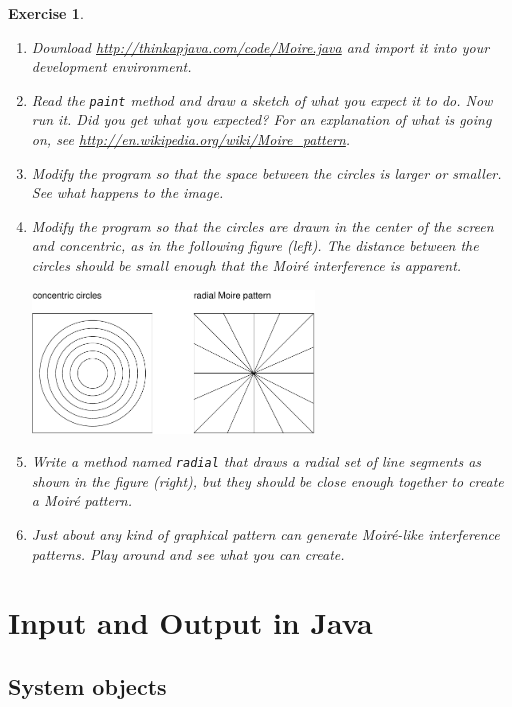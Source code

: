 \documentclass[12pt]{book}
\theoremstyle{exercise}
\newtheorem{exercise}{Exercise}[chapter]
\begin{document}
\begin{exercise}
\begin{enumerate}

\item Download
\url{http://thinkapjava.com/code/Moire.java} and import it into
your development environment.

\item Read the {\tt paint} method and draw a sketch of
what you expect it to do.  Now run it.  Did you get what you
expected?  For an explanation of what is going on, see
\url{http://en.wikipedia.org/wiki/Moire_pattern}.

\item Modify the program so that the space between the circles is
larger or smaller.  See what happens to the image.

\item Modify the program so that the circles are drawn in the center
of the screen and concentric, as in the following figure (left).
The distance between the circles should be small enough
that the Moir\'{e} interference is apparent.

\includegraphics[height=1.5in]{figs/moire.pdf}

\item Write a method named {\tt radial} that draws a radial set
of line segments as shown in the figure (right), but they should be close
enough together to create a Moir\'{e} pattern.

\item Just about any kind of graphical pattern can generate
Moir\'{e}-like interference patterns.  Play around and see what you
can create.

\end{enumerate}
\end{exercise}


\chapter{Input and Output in Java}
\label{javaio}

\section{System objects}
\label{system}
\end{document}
